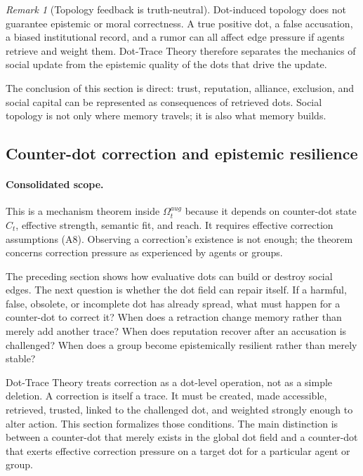 \documentclass[11pt]{article}
\theoremstyle{remark}
\newtheorem{remark}{Remark}
\begin{document}
\begin{remark}[Topology feedback is truth-neutral]
Dot-induced topology does not guarantee epistemic or moral correctness.
A true positive dot, a false accusation, a biased institutional record,
and a rumor can all affect edge pressure if agents retrieve and weight
them. Dot-Trace Theory therefore separates the mechanics of social
update from the epistemic quality of the dots that drive the update.
\end{remark}

The conclusion of this section is direct: trust, reputation, alliance,
exclusion, and social capital can be represented as consequences of
retrieved dots. Social topology is not only where memory travels; it is
also what memory builds.

\subsection{Counter-dot correction and epistemic resilience}\label{counter-dot-correction-and-epistemic-resilience}

\paragraph{Consolidated scope.} This is a mechanism theorem inside $\Omega_t^{aug}$ because it depends on counter-dot state $C_t$, effective strength, semantic fit, and reach. It requires effective correction assumptions (A8). Observing a correction's existence is not enough; the theorem concerns correction pressure as experienced by agents or groups.

The preceding section shows how evaluative dots can build or destroy
social edges. The next question is whether the dot field can repair
itself. If a harmful, false, obsolete, or incomplete dot has already
spread, what must happen for a counter-dot to correct it? When does a
retraction change memory rather than merely add another trace? When does
reputation recover after an accusation is challenged? When does a group
become epistemically resilient rather than merely stable?

Dot-Trace Theory treats correction as a dot-level operation, not as a
simple deletion. A correction is itself a trace. It must be created,
made accessible, retrieved, trusted, linked to the challenged dot, and
weighted strongly enough to alter action. This section formalizes those
conditions. The main distinction is between a counter-dot that merely
exists in the global dot field and a counter-dot that exerts effective
correction pressure on a target dot for a particular agent or group.
\end{document}
